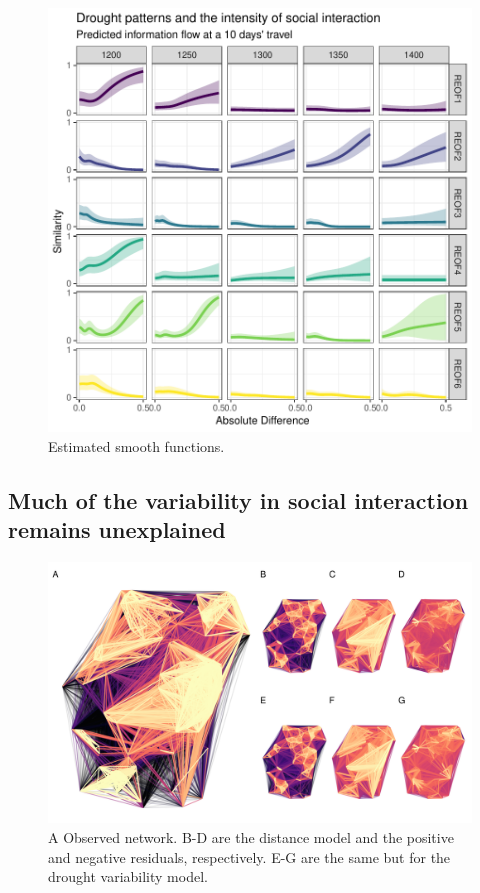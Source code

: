 \documentclass[11pt]{wlscirep}
\begin{document}
\begin{figure}[!htbp]
\centering
\includegraphics[width=.6\linewidth]{figures/smooths.pdf}
\caption{Estimated smooth functions.}
\label{fig:smooths}
\end{figure}



\subsection*{Much of the variability in social interaction remains unexplained}

\begin{figure}[!htbp]
\centering
\includegraphics[width=.8\linewidth]{figures/null_model.png}
\caption{A Observed network. B-D are the distance model and the positive and negative residuals, respectively. E-G are the same but for the drought variability model.}
\label{fig:residuals}
\end{figure}
\end{document}
